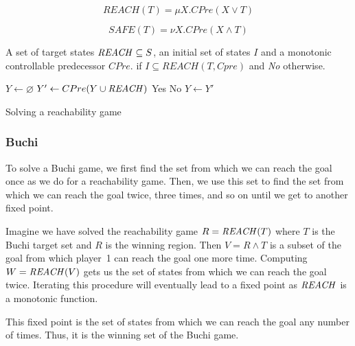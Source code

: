 \begin{equation}
    \mathit{REACH}(T) = \mu X. CPre(X \vee T)
\label{equ:mu_reach}
\end{equation}

\begin{equation}
\mathit{SAFE}(T) = \nu X. CPre(X \wedge T)
\label{equ:mu_safe}
\end{equation}

\begin{algorithm}
\begin{algorithmic}

\Require A set of target states $\mathit{REACH} \subseteq S$, an initial set of states $I$ and a monotonic controllable predecessor $CPre$.
 if $I \subseteq REACH(T, Cpre)$ and {\it No} otherwise.

    \State $Y \gets \varnothing$
    \Loop
        \State $Y' \gets CPre(Y \cup \mathit{REACH})$
                \State\Return Yes
            \Else
                \State\Return No
            \EndIf
        \EndIf
        \State $Y \gets Y'$
    \EndLoop
\EndFunction

\end{algorithmic}
\caption{Solving a reachability game}
\label{a:reach}
\end{algorithm}

\subsubsection{Buchi}

To solve a Buchi game, we first find the set from which we can reach the goal once as we do for a reachability game. Then, we use this set to find the set from which we can reach the goal twice, three times, and so on until we get to another fixed point. 

Imagine we have solved the reachability game $R = \mathit{REACH}(T)$ where $T$ is the Buchi target set and $R$ is the winning region. Then $V = R \wedge T$ is a subset of the goal from which player~1 can reach the goal one more time. Computing $W = \mathit{REACH}(V)$ gets us the set of states from which we can reach the goal twice. Iterating this procedure will eventually lead to a fixed point as $\mathit{REACH}$ is a monotonic function.

This fixed point is the set of states from which we can reach the goal any number of times. Thus, it is the winning set of the Buchi game. 


